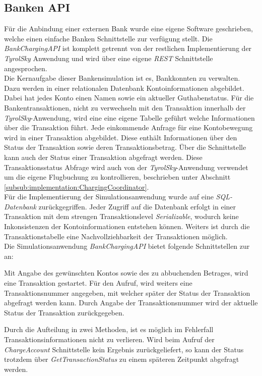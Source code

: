 \subsection{Banken API}
\label{subsec:implementation:bankApi}
Für die Anbindung einer externen Bank wurde eine eigene Software geschrieben, welche einen einfache Banken Schnittstelle zur verfügung stellt. Die \textit{BankChargingAPI} ist komplett getrennt von der restlichen Implementierung der \textit{TyrolSky} Anwendung und wird über eine eigene \textit{REST} Schnittstelle angesprochen. \\
Die Kernaufgabe dieser Bankensimulation ist es, Bankkonnten zu verwalten. Dazu werden in einer relationalen Datenbank Kontoinformationen abgebildet. Dabei hat jedes Konto einen Namen sowie ein aktueller Guthabenstatus. Für die Bankentransaktionen, nicht zu verwechseln mit den Transaktion innerhalb der \textit{TyrolSky}-Anwendung, wird eine eine eigene Tabelle geführt welche Informationen über die Transaktion führt. Jede einkommende Anfrage für eine Kontobewegung wird in einer Transaktion abgebildet. Diese enthält Informationen über den Status der Transaktion sowie deren Transaktionsbetrag. Über die Schnittstelle kann auch der Status einer Transaktion abgefragt werden. Diese Transaktionsstatus Abfrage wird auch von der \textit{TyrolSky}-Anwendung verwendet um die eigene Flugbuchung zu kontrollieren, beschrieben unter Abschnitt \ref{subsub:implementation:ChargingCoordinator}. \\
Für die Implementierung der Simulationsanwendung wurde auf eine \textit{SQL-Datenbank} zurückgegriffen. Jeder Zugriff auf die Datenbank erfolgt in einer Transaktion mit dem strengen Transaktionslevel \textit{Serializable}, wodurch keine Inkonsistenzen der Kontoinformationen entstehen können. Weiters ist durch die Transaktionstabelle eine Nachvollziehbarkeit der Transaktionen möglich. \\
Die Simulationsanwendung \textit{BankChargingAPI} bietet folgende Schnittstellen zur an:
\begin{itemize}
        Mit Angabe des gewünschten Kontos sowie des zu abbuchenden Betrages, wird eine Transaktion gestartet. Für den Aufruf, wird weiters eine Transaktionsnummer angegeben, mit welcher später der Status der Transaktion abgefragt werden kann.
        Durch Angabe der Transaktionsnummer wird der aktuelle Status der Transaktion zurückgegeben. 
\end{itemize}
Durch die Aufteilung in zwei Methoden, ist es möglich im Fehlerfall Transaktionsinformationen nicht zu verlieren. Wird beim Aufruf der \textit{ChargeAccount} Schnittstelle kein Ergebnis zurückgeliefert, so kann der Status trotzdem über \textit{GetTransactionStatus} zu einem späteren Zeitpunkt abgefragt werden.

